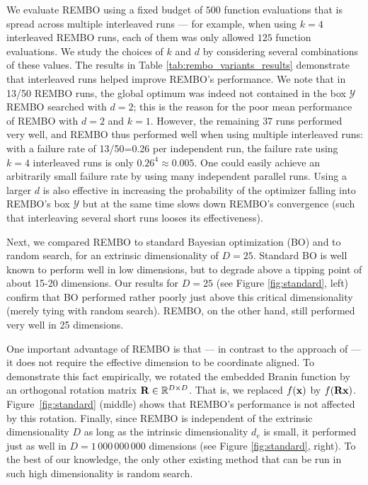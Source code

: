 \documentclass{article}
\begin{document}
We evaluate REMBO using a fixed budget of $500$ function
evaluations that is spread across multiple interleaved runs ---
for example, when using $k = 4$ interleaved REMBO runs,
each of them was only allowed $125$ function evaluations. 
We study the choices of $k$ and $d$ by considering several combinations of these values.
The results in Table \ref{tab:rembo_variants_results} demonstrate that interleaved runs helped improve REMBO's performance.
We note that in 13/50 REMBO runs, the global optimum was indeed not contained in the box $\mathcal{Y}$ REMBO searched with $d=2$; this is the reason for the poor mean performance of REMBO with $d=2$ and $k=1$.
However, the remaining $37$ runs performed very well, and REMBO thus performed well when using multiple interleaved runs: with a failure rate of 13/50=0.26 per independent run, the failure rate using $k=4$ interleaved runs is only $0.26^4\approx 0.005$. One could easily achieve an arbitrarily small failure rate by using many independent parallel runs. 
Using a larger $d$ is also effective in increasing the probability of the optimizer falling into REMBO's box $\mathcal{Y}$ but at the same time slows down REMBO's convergence (such that interleaving several short runs looses its effectiveness). 
 
Next, we compared REMBO to standard Bayesian optimization (BO) and to random search, for an extrinsic dimensionality of $D=25$. 
Standard BO is well known to perform well in low dimensions, but to degrade above a tipping point of about 15-20 dimensions. Our results for $D=25$ (see Figure \ref{fig:standard}, left) confirm that BO performed rather poorly just above this critical dimensionality (merely tying with random search). 
REMBO, on the other hand, still performed very well in 25 dimensions.

One important advantage of REMBO is that --- in contrast to the approach of \cite{Chen:2012} --- it does not require the effective dimension to be coordinate aligned. To demonstrate this fact empirically, we rotated the embedded Branin function by an orthogonal rotation matrix $\mathbf{R} \in \mathbb{R}^{D\times D}$. That is, we replaced $f(\mathbf{x})$ by $f(\mathbf{R} \mathbf{x})$.
Figure~\ref{fig:standard} (middle) shows that REMBO's performance is not affected by this rotation. 
Finally, since REMBO is independent of the extrinsic dimensionality $D$ as long as the intrinsic dimensionality $d_e$ is small, it performed just as well in $D=1\,000\,000\,000$ dimensions (see Figure \ref{fig:standard}, right). 
To the best of our knowledge, the only other existing method that can be run in such high dimensionality is random search.
\end{document}
